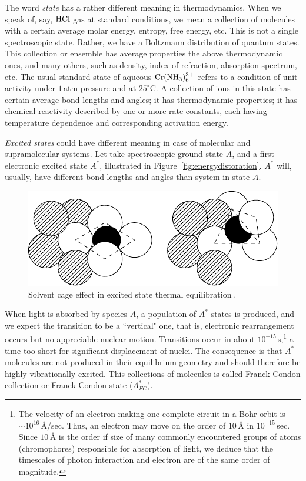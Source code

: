 The word \emph{state} has a rather different meaning in thermodynamics. When we speak of, say, $\rm HCl$ gas at standard conditions, we mean a collection of molecules with a certain average molar energy, entropy, free energy, etc. This is not a single spectroscopic state. Rather, we have a Boltzmann distribution of quantum states. This collection or ensemble has average properties the above thermodynamic ones, and many others, such as density, index of refraction, absorption spectrum, etc. The usual standard state of aqueous $\rm Cr(NH_3)_6^{3+}$ refers to a condition of unit activity under $1$\,atm pressure and at $25^\circ$C. A collection of ions in this state has certain average bond lengths and angles; it has thermodynamic properties; it has chemical reactivity described by one or more rate constants, each having temperature dependence and corresponding activation energy.\cite{adamson-1983}\par

\emph{Excited states} could have different meaning in case of molecular and supramolecular systems. Let take spectroscopic ground state $A$, and a first electronic excited state $ A^*$, illustrated in Figure~\ref{fig:energydistoration}. $ A^*$ will, usually, have different bond lengths and angles than system in state $A$.\par

\begin{figure}
	\centering
	\centering
	\addtocounter{totalfigures}{1} 
	\includegraphics[width=.8\linewidth]{figures/Chapter2/cageeffect}
	\caption{Solvent cage effect in excited state thermal equilibration\,\cite{adamson-1983}.}
	\label{fig:cageeffect}	
\end{figure}

When light is absorbed by species $A$, a population of $ A^*$ states is produced, and we expect the transition to be a ``vertical" one, that is, electronic rearrangement occurs but no appreciable nuclear motion. Transitions occur in about $10^{-15}$\,s,\footnote{The velocity of an electron making one complete circuit in a Bohr orbit is $\sim 10^{16}$\,\AA/sec. Thus, an electron may move on the order of $10$\,{\AA} in $10^{-15}$\,sec. Since $10$\,{\AA} is the order if size of many commonly encountered groups of atoms (chromophores) responsible for absorption of light, we deduce that the timescales of photon interaction and electron are of the same order of magnitude.\cite{turro-1991}} a time too short for significant displacement of nuclei. The consequence is that $A^*$ molecules are not produced in their equilibrium geometry and should therefore be highly vibrationally excited. This collections of molecules is called Franck-Condon collection or Franck-Condon state ($A^*_{FC}$).\cite{adamson-1983}\par

